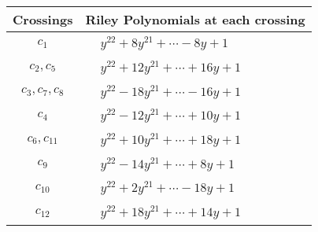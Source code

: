 \documentclass[1p]{elsarticle_modified}
\theoremstyle{definition}
\begin{document}
\begin{tabular}{m{50pt}|m{274pt}}
Crossings & \hspace{64pt}Riley Polynomials at each crossing \\
\hline $$\begin{aligned}c_{1}\end{aligned}$$&$\begin{aligned}
&y^{22}+8 y^{21}+\cdots-8 y+1
\end{aligned}$\\
\hline $$\begin{aligned}c_{2},c_{5}\end{aligned}$$&$\begin{aligned}
&y^{22}+12 y^{21}+\cdots+16 y+1
\end{aligned}$\\
\hline $$\begin{aligned}c_{3},c_{7},c_{8}\end{aligned}$$&$\begin{aligned}
&y^{22}-18 y^{21}+\cdots-16 y+1
\end{aligned}$\\
\hline $$\begin{aligned}c_{4}\end{aligned}$$&$\begin{aligned}
&y^{22}-12 y^{21}+\cdots+10 y+1
\end{aligned}$\\
\hline $$\begin{aligned}c_{6},c_{11}\end{aligned}$$&$\begin{aligned}
&y^{22}+10 y^{21}+\cdots+18 y+1
\end{aligned}$\\
\hline $$\begin{aligned}c_{9}\end{aligned}$$&$\begin{aligned}
&y^{22}-14 y^{21}+\cdots+8 y+1
\end{aligned}$\\
\hline $$\begin{aligned}c_{10}\end{aligned}$$&$\begin{aligned}
&y^{22}+2 y^{21}+\cdots-18 y+1
\end{aligned}$\\
\hline $$\begin{aligned}c_{12}\end{aligned}$$&$\begin{aligned}
&y^{22}+18 y^{21}+\cdots+14 y+1
\end{aligned}$\\
\hline
\end{tabular}\\~\\
\end{document}
